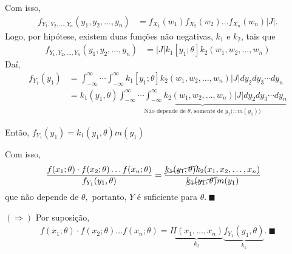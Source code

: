 \documentclass[12pt]{beamer}
\begin{document}
\begin{frame}{}
\begin{block}{}
\justifying
Com isso, 
\begin{align*}
	f_{Y_{1}, Y_{2}, \ldots, Y_{n}}(y_{1}, y_{2}, \ldots, y_{n})&=f_{X_{1}}(w_{1})f_{X_{2}}(w_{2})\ldots f_{X_{n}}(w_{n})|J|.
\end{align*}
Logo, por hipótese, existem duas funções não negativas, $k_1$ e $k_2$, tais que
\begin{align*}
    f_{Y_{1}, Y_{2}, \ldots, Y_{n}}(y_{1}, y_{2}, \ldots, y_{n})&=|J|k_1[y_{1}; \theta]k_2(w_1, w_2, \ldots, w_n)
\end{align*}
Daí,
\begin{align*}
    f_{Y_{1}}(y_{1})&=\int_{-\infty}^{\infty}\cdots \int_{-\infty}^{\infty} k_1[y_{1}; \theta]k_2(w_1, w_2, \ldots, w_n)|J|dy_{2}dy_{3}\cdots dy_{n}\\
    &=k_{1}(y_{1},\theta)\underbrace{\int_{-\infty}^{\infty}\cdots \int_{-\infty}^{\infty} k_2(w_1, w_2, \ldots, w_n)|J|dy_{2}dy_{3}\cdots dy_{n}}_{\text{Não depende de $\theta$, somente de $y_{1}$(=$m(y_{1})$)}}
\end{align*}
\end{block}
\pause
\begin{block}{}
\justifying
Então, $f_{Y_{1}}(y_{1})=k_{1}(y_{1},\theta)m(y_{1})$
\end{block}
\end{frame}

\begin{frame}{}
\begin{block}{}
\justifying
Com isso, 
\begin{align*}
    \dfrac{f(x_{1}; \theta) \cdot f(x_{2}; \theta) \ldots f(x_{n}; \theta)}{f_{Y_{1}}(y_{1},\theta)}&=\dfrac{\cancel{k_{1}(y_{1},\theta)}k_{2}(x_1, x_2, \ldots, x_n)}{\cancel{k_{1}(y_{1},\theta)}m(y_{1})}
\end{align*}
que não depende de $\theta,$ portanto, $Y$ é suficiente para $\theta.~\blacksquare$
\end{block}
\end{frame}

\begin{frame}{}
\begin{block}{$(\Rightarrow{})$}
\justifying
Por suposição,
\begin{align*}
    f(x_{1}; \theta) \cdot f(x_{2}; \theta) \ldots f(x_{n}; \theta)=\underbrace{H(x_{1},\ldots, x_{n})}_{k_{2}}\underbrace{f_{Y_{1}}(y_{1},\theta)}_{k_{1}}.~\blacksquare
\end{align*}
\end{block}
\end{frame}
\end{document}
